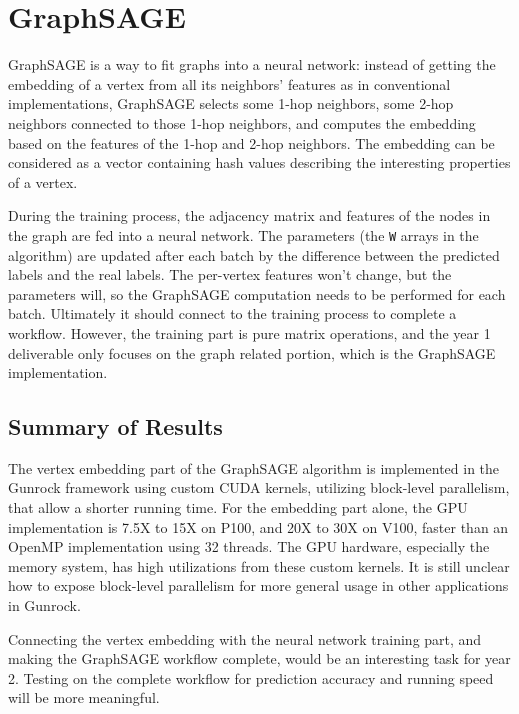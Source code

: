 \documentclass[10pt,oneside]{memoir}
\begin{document}
\hypertarget{graphsage-1}{%
\chapter{GraphSAGE}\label{graphsage-1}}

GraphSAGE is a way to fit graphs into a neural network: instead of
getting the embedding of a vertex from all its neighbors' features as in
conventional implementations, GraphSAGE selects some 1-hop neighbors,
some 2-hop neighbors connected to those 1-hop neighbors, and computes
the embedding based on the features of the 1-hop and 2-hop neighbors.
The embedding can be considered as a vector containing hash values
describing the interesting properties of a vertex.

During the training process, the adjacency matrix and features of the
nodes in the graph are fed into a neural network. The parameters (the
\texttt{W} arrays in the algorithm) are updated after each batch by the
difference between the predicted labels and the real labels. The
per-vertex features won't change, but the parameters will, so the
GraphSAGE computation needs to be performed for each batch. Ultimately
it should connect to the training process to complete a workflow.
However, the training part is pure matrix operations, and the year 1
deliverable only focuses on the graph related portion, which is the
GraphSAGE implementation.

\hypertarget{summary-of-results-2}{%
\section{Summary of Results}\label{summary-of-results-2}}

The vertex embedding part of the GraphSAGE algorithm is implemented in
the Gunrock framework using custom CUDA kernels, utilizing block-level
parallelism, that allow a shorter running time. For the embedding part
alone, the GPU implementation is 7.5X to 15X on P100, and 20X to 30X on
V100, faster than an OpenMP implementation using 32 threads. The GPU
hardware, especially the memory system, has high utilizations from these
custom kernels. It is still unclear how to expose block-level
parallelism for more general usage in other applications in Gunrock.

Connecting the vertex embedding with the neural network training part,
and making the GraphSAGE workflow complete, would be an interesting task
for year 2. Testing on the complete workflow for prediction accuracy and
running speed will be more meaningful.
\end{document}

